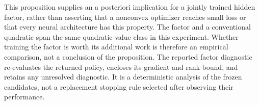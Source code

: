 This proposition supplies an a posteriori implication for a jointly trained
hidden factor, rather than asserting that a nonconvex optimizer reaches
small loss or that every neural architecture has this property. The factor
and a conventional quadratic span the same quadratic value class in this
experiment. Whether training the factor is worth its additional work is
therefore an empirical comparison, not a conclusion of the proposition.
The reported factor diagnostic re-evaluates the returned policy, encloses
its gradient and rank bound, and retains any unresolved diagnostic. It is a
deterministic analysis of the frozen candidates, not a replacement stopping
rule selected after observing their performance.
